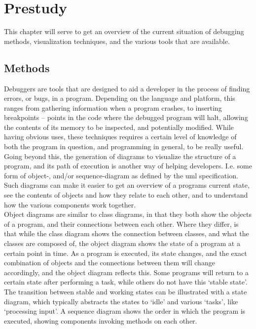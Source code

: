 \chapter{Prestudy}\label{prestudy}%
This chapter will serve to get an overview of the current situation of debugging methods, visualization techniques, and the various tools that are available.
\section{Methods}\label{preMethods}
Debuggers are tools that are designed to aid a developer in the process of finding errors, or bugs, in a program.
Depending on the language and platform, this ranges from gathering information when a program crashes, to inserting \glspl{breakpoint} -- points in the code where the debugged program will halt, allowing the contents of its memory to be inspected, and potentially modified.
While having obvious uses, these techniques requires a certain level of knowledge of both the program in question, and programming in general, to be really useful.
Going beyond this, the generation of diagrams to visualize the structure of a program, and its path of execution is another way of helping developers.
I.e. some form of object-, and/or sequence-diagram as defined by the \gls{uml} specification.
Such diagrams can make it easier to get an overview of a programs current state, see the contents of objects and how they relate to each other, and to understand how the various components work together.
~\\

Object diagrams are similar to class diagrams, in that they both show the objects of a program, and their connections between each other.
Where they differ, is that while the class diagram shows the connection between classes, and what the classes are composed of, the object diagram shows the state of a program at a certain point in time.
As a program is executed, its state changes, and the exact combination of objects and the connections between them will change accordingly, and the object diagram reflects this.
Some programs will return to a certain state after performing a task, while others do not have this `stable state'.
The transition between stable and working states can be illustrated with a state diagram, which typically abstracts the states to `idle' and various `tasks', like `processing input'.
A sequence diagram shows the order in which the program is executed, showing components invoking methods on each other.
~\\

